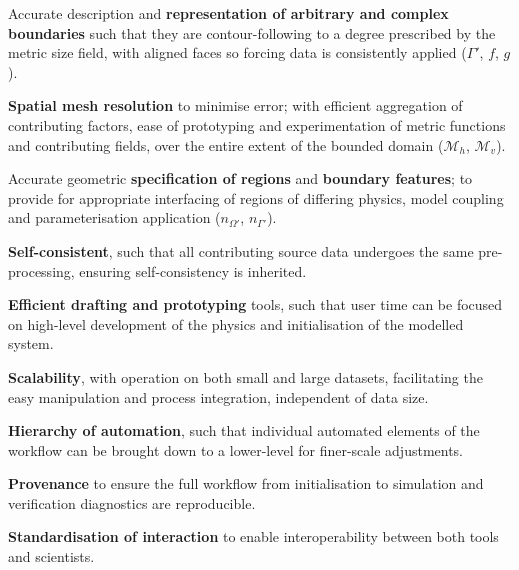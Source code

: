 \documentclass[a4paper, 10pt]{book}
\begin{document}
\begin{table}[!h]
\centering
\begin{minipage}{\columnwidth}
{
\renewcommand{\emph}[1]{\textbf{\textsf{#1}}}
\noindent \hrulefill
\begin{tenetenum}[
labelindent=*,
style=multiline,
leftmargin=*,
]
\setlength\itemsep{0em}
\item \label{tenet:brep} %
      Accurate description and \emph{representation of arbitrary and complex boundaries}
      such that they are contour-following to a degree prescribed by the metric size field,
      with aligned faces so forcing data is consistently applied ($\Gamma'$, $f$, $g$).
\item \label{tenet:metric} %
      \emph{Spatial mesh resolution} to minimise error; with efficient aggregation of contributing factors,
      ease of prototyping and experimentation of metric functions and contributing fields,
      over the entire extent of the bounded domain ($\mathcal{M}_h$, $\mathcal{M}_v$).
\item \label{tenet:region} %
      Accurate geometric \emph{specification of regions} and \emph{boundary features};
      to provide for appropriate interfacing of regions of differing physics,
      model coupling and parameterisation application ($n_{\Omega'}$, $n_{\Gamma'}$).
\item \label{tenet:consistent} %
      \emph{Self-consistent}, such that all contributing source data undergoes the same pre-processing,
      ensuring self-consistency is inherited.
\item \label{tenet:efficient} %
      \emph{Efficient drafting and prototyping} tools,
      such that user time can be focused on high-level development of the physics and
      initialisation of the modelled system.
\item \label{tenet:scales} %
      \emph{Scalability}, with operation on both small and large datasets,
      facilitating the easy manipulation and process integration, independent of data size.
\item \label{tenet:automated} %
      \emph{Hierarchy of automation}, such that individual automated elements of the workflow
      can be brought down to a lower-level for finer-scale adjustments.
\item \label{tenet:provenance} %
      \emph{Provenance} to ensure the full workflow from initialisation to simulation and
      verification diagnostics are reproducible.
\item \label{tenet:standard} %
      \emph{Standardisation of interaction} to enable interoperability between both tools and scientists.
\end{tenetenum}
\noindent \hrulefill
}
\end{minipage}
\caption{
The nine tenets of geophysical mesh generation.
Solutions to the spatial discretisation of geophysical model domains need to address these nine attributes
\cite[from][]{candybrep}.
}
\label{fig:tenets}
\end{table}
%
\end{document}
